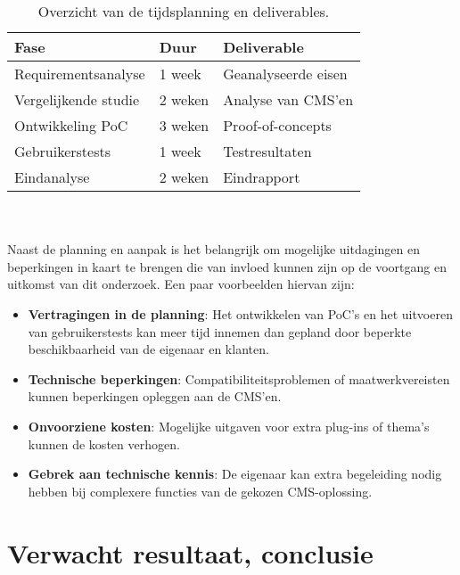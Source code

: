 \begin{table}[h!]
    \centering
    \begin{tabular}{|p{3.65cm}|p{1.5cm}|p{2.5cm}|}
        \hline
        \textbf{Fase} & \textbf{Duur} & \textbf{Deliverable} \\ \hline
        Requirementsanalyse & 1 week & Geanalyseerde eisen \\ \hline
        Vergelijkende studie & 2 weken & Analyse van CMS'en \\ \hline
        Ontwikkeling PoC & 3 weken & Proof-of-concepts \\ \hline
        Gebruikerstests & 1 week & Testresultaten \\ \hline
        Eindanalyse & 2 weken & Eindrapport \\ \hline
    \end{tabular}
    \caption{Overzicht van de tijdsplanning en deliverables.}
    \label{tab:tijdsplanning}
\end{table}


\\ \\
Naast de planning en aanpak is het belangrijk om mogelijke uitdagingen en beperkingen in kaart te brengen die van invloed kunnen zijn op de voortgang en uitkomst van dit onderzoek. Een paar voorbeelden hiervan zijn:
\begin{itemize}
    \item \textbf{Vertragingen in de planning}: Het ontwikkelen van PoC’s en het uitvoeren van gebruikerstests kan meer tijd innemen dan gepland door beperkte beschikbaarheid van de eigenaar en klanten.
    \item \textbf{Technische beperkingen}: Compatibiliteitsproblemen of maatwerkvereisten kunnen beperkingen opleggen aan de CMS’en.
    \item \textbf{Onvoorziene kosten}: Mogelijke uitgaven voor extra plug-ins of thema’s kunnen de kosten verhogen.
    \item \textbf{Gebrek aan technische kennis}: De eigenaar kan extra begeleiding nodig hebben bij complexere functies van de gekozen CMS-oplossing.
\end{itemize}


\section{Verwacht resultaat, conclusie}%
\label{sec:verwachte_resultaten}

